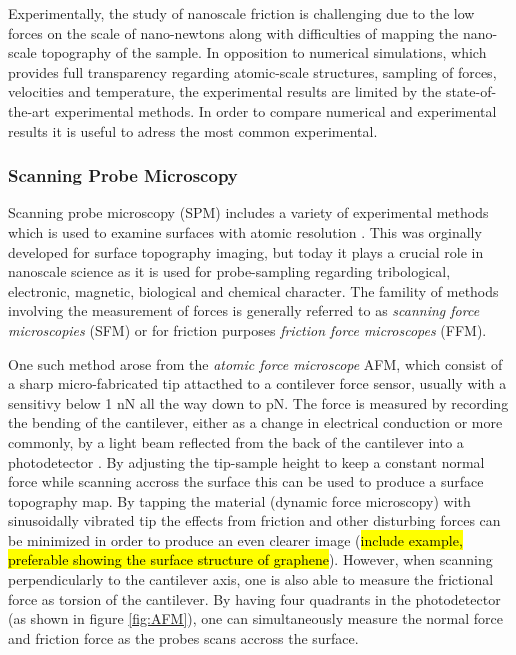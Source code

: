 Experimentally, the study of nanoscale friction is challenging due to the low
forces on the scale of nano-newtons along with difficulties of mapping the
nano-scale topography of the sample. In opposition to numerical simulations, which provides full
transparency regarding atomic-scale structures, sampling of forces, velocities
and temperature, the experimental results are limited by the state-of-the-art
experimental methods. In order to compare numerical and experimental results it is useful to adress the most common experimental.

\subsubsection{Scanning Probe Microscopy}\label{sec:SPM} Scanning probe
microscopy (\acrshort{SPM}) includes a variety of experimental methods which is used to
examine surfaces with atomic resolution \cite[pp. 6-27]{BHUSHAN20051507}. This was
orginally developed for surface topography imaging, but today it plays a crucial
role in nanoscale science as it is used for probe-sampling regarding
tribological, electronic, magnetic, biological and chemical character. The
famility of methods involving the measurement of forces is generally referred to
as \textit{scanning force microscopies} (\acrshort{SFM}) or for friction purposes
\textit{friction force microscopes} (\acrshort{FFM}).

One such method arose from the \textit{atomic force microscope} \acrshort{AFM}, which consist
of a sharp micro-fabricated tip attacthed to a contilever force sensor, usually
with a sensitivy below 1 nN all the way down to pN. The force is measured by recording the bending of
the cantilever, either as a change in electrical conduction or more commonly, by
a light beam reflected from the back of the cantilever into a photodetector
\cite[p. 183]{gnecco_meyer_2015}. By adjusting the tip-sample height to keep a constant
normal force while scanning accross the surface this can be used to produce a
surface topography map. By tapping the material (dynamic force microscopy) with
sinusoidally vibrated tip the effects from friction and other disturbing forces
can be minimized in order to produce an even clearer image (\hl{include example,
preferable showing the surface structure of graphene}). However, when scanning
perpendicularly to the cantilever axis, one is also able to measure the
frictional force as torsion of the cantilever. By having four quadrants in the
photodetector (as shown in figure \cref{fig:AFM}), one can simultaneously
measure the normal force and friction force as the probes scans accross the
surface. 

